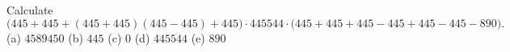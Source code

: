 Calculate
\[\bigl(445+445+(445+445)(445-445)+445\bigr)\cdot445544\cdot\bigl(445+445+445-445+445-445-890\bigr).\]
(a) $4589450$ \qquad (b) $445$ \qquad (c) $0$ \qquad (d) $445544$ \qquad (e) $890$
